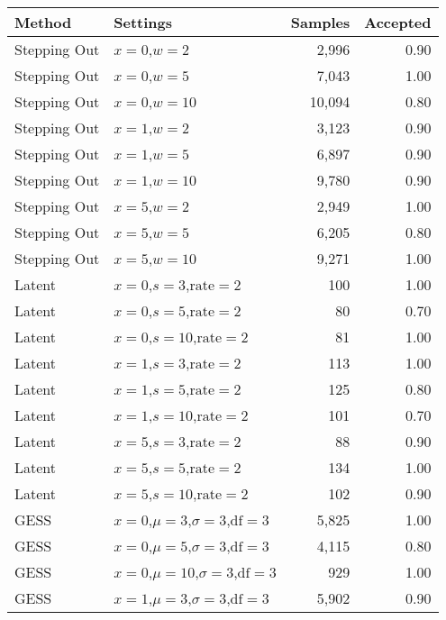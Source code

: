 \begin{table}[h]
\centering
\begin{tabular}{llrr}
  \hline
Method & Settings & Samples & Accepted \\ 
  \hline
Stepping Out & $x = 0  $,$w =  2 $ & 2,996 & 0.90 \\ 
  Stepping Out & $x = 0  $,$w =  5 $ & 7,043 & 1.00 \\ 
  Stepping Out & $x = 0  $,$w =  10 $ & 10,094 & 0.80 \\ 
  Stepping Out & $x = 1  $,$w =  2 $ & 3,123 & 0.90 \\ 
  Stepping Out & $x = 1  $,$w =  5 $ & 6,897 & 0.90 \\ 
  Stepping Out & $x = 1  $,$w =  10 $ & 9,780 & 0.90 \\ 
  Stepping Out & $x = 5  $,$w =  2 $ & 2,949 & 1.00 \\ 
  Stepping Out & $x = 5  $,$w =  5 $ & 6,205 & 0.80 \\ 
  Stepping Out & $x = 5  $,$w =  10 $ & 9,271 & 1.00 \\ 
  Latent & $x = 0  $,$s =  3  $,$\text{rate} =  2 $ & 100 & 1.00 \\ 
  Latent & $x = 0  $,$s =  5  $,$\text{rate} =  2 $ & 80 & 0.70 \\ 
  Latent & $x = 0  $,$s =  10  $,$\text{rate} =  2 $ & 81 & 1.00 \\ 
  Latent & $x = 1  $,$s =  3  $,$\text{rate} =  2 $ & 113 & 1.00 \\ 
  Latent & $x = 1  $,$s =  5  $,$\text{rate} =  2 $ & 125 & 0.80 \\ 
  Latent & $x = 1  $,$s =  10  $,$\text{rate} =  2 $ & 101 & 0.70 \\ 
  Latent & $x = 5  $,$s =  3  $,$\text{rate} =  2 $ & 88 & 0.90 \\ 
  Latent & $x = 5  $,$s =  5  $,$\text{rate} =  2 $ & 134 & 1.00 \\ 
  Latent & $x = 5  $,$s =  10  $,$\text{rate} =  2 $ & 102 & 0.90 \\ 
  GESS & $x = 0  $,$\mu =  3  $,$\sigma =  3  $,$\text{df} =  3 $ & 5,825 & 1.00 \\ 
  GESS & $x = 0  $,$\mu =  5  $,$\sigma =  3  $,$\text{df} =  3 $ & 4,115 & 0.80 \\ 
  GESS & $x = 0  $,$\mu =  10  $,$\sigma =  3  $,$\text{df} =  3 $ & 929 & 1.00 \\ 
  GESS & $x = 1  $,$\mu =  3  $,$\sigma =  3  $,$\text{df} =  3 $ & 5,902 & 0.90 \\ 

\end{tabular}
\end{table}
